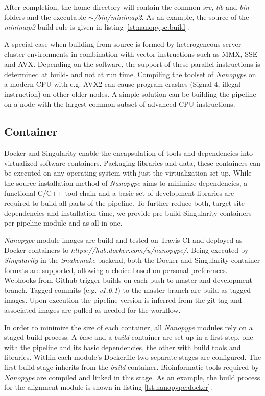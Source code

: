 After completion, the home directory will contain the common \textit{src}, \textit{lib} and \textit{bin} folders and the executable $\sim$\textit{/bin/minimap2}. As an example, the source of the \textit{minimap2} build rule is given in listing \ref{lst:nanopype:build}.

A special case when building from source is formed by heterogeneous server cluster environments in combination with vector instructions such as MMX, SSE and AVX. Depending on the software, the support of these parallel instructions is determined at build- and not at run time. Compiling the toolset of \textit{Nanopype} on a modern CPU with e.g. AVX2 can cause program crashes (Signal 4, illegal instruction) on other older nodes. A simple solution can be building the pipeline on a node with the largest common subset of advanced CPU instructions.


\subsection{Container}

Docker and Singularity enable the encapsulation of tools and dependencies into virtualized software containers. Packaging libraries and data, these containers can be executed on any operating system with just the virtualization set up. While the source installation method of \textit{Nanopype} aims to minimize dependencies, a functional C/C++ tool chain and a basic set of development libraries are required to build all parts of the pipeline. To further reduce both, target site dependencies and installation time, we provide pre-build Singularity containers per pipeline module and as all-in-one.

\textit{Nanopype} module images are build and tested on Travis-CI and deployed as Docker containers to \textit{https://hub.docker.com/u/nanopype/}. Being executed by \textit{Singularity} in the \textit{Snakemake} backend, both the Docker and Singularity container formats are supported, allowing a choice based on personal preferences.
Webhooks from Github trigger builds on each push to master and development branch. Tagged commits (e.g. \textit{v1.0.1}) to the master branch are build as tagged images. Upon execution the pipeline version is inferred from the git tag and associated images are pulled as needed for the workflow.


In order to minimize the size of each container, all \textit{Nanopype} modules rely on a staged build process. A \textit{base} and a \textit{build} container are set up in a first step, one with the pipeline and its basic dependencies, the other with build tools and libraries. Within each module's Dockerfile two separate stages are configured. The first build stage inherits from the \textit{build} container. Bioinformatic tools required by \textit{Nanopype} are compiled and linked in this stage. As an example, the build process for the alignment module is shown in listing \ref{lst:nanopype:docker}.

